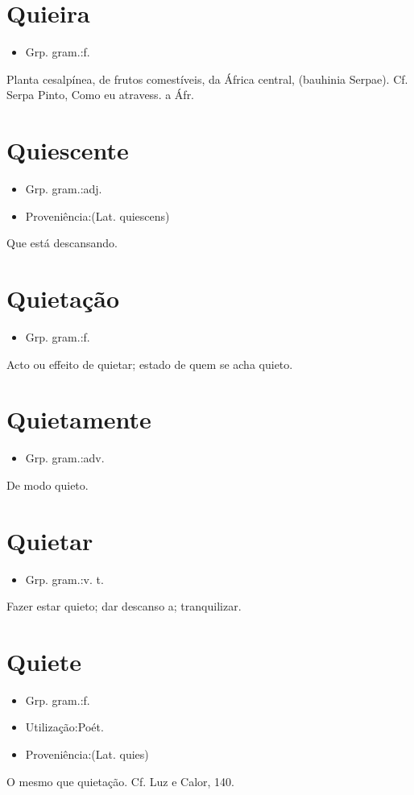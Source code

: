 \section{Quieira}
\begin{itemize}
\item {Grp. gram.:f.}
\end{itemize}
Planta cesalpínea, de frutos comestíveis, da África central, (\textunderscore bauhinia Serpae\textunderscore ). Cf. Serpa Pinto, \textunderscore Como eu atravess. a Áfr.\textunderscore 
\section{Quiescente}
\begin{itemize}
\item {Grp. gram.:adj.}
\end{itemize}
\begin{itemize}
\item {Proveniência:(Lat. \textunderscore quiescens\textunderscore )}
\end{itemize}
Que está descansando.
\section{Quietação}
\begin{itemize}
\item {Grp. gram.:f.}
\end{itemize}
Acto ou effeito de quietar; estado de quem se acha quieto.
\section{Quietamente}
\begin{itemize}
\item {Grp. gram.:adv.}
\end{itemize}
De modo quieto.
\section{Quietar}
\begin{itemize}
\item {Grp. gram.:v. t.}
\end{itemize}
Fazer estar quieto; dar descanso a; tranquilizar.
\section{Quiete}
\begin{itemize}
\item {Grp. gram.:f.}
\end{itemize}
\begin{itemize}
\item {Utilização:Poét.}
\end{itemize}
\begin{itemize}
\item {Proveniência:(Lat. \textunderscore quies\textunderscore )}
\end{itemize}
O mesmo que \textunderscore quietação\textunderscore . Cf. \textunderscore Luz e Calor\textunderscore , 140.

